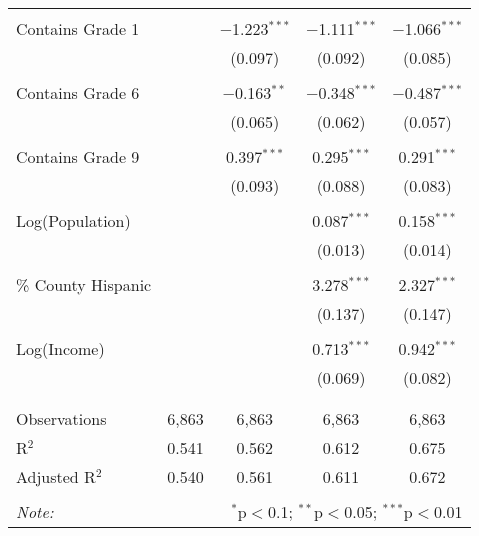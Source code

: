 \begin{table}[!htbp]
\begin{tabular}{@{\extracolsep{-2pt}}lcccc}
  & & & & \\ 
 Contains Grade 1 &  & $-$1.223$^{***}$ & $-$1.111$^{***}$ & $-$1.066$^{***}$ \\ 
  &  & (0.097) & (0.092) & (0.085) \\ 
  & & & & \\ 
 Contains Grade 6 &  & $-$0.163$^{**}$ & $-$0.348$^{***}$ & $-$0.487$^{***}$ \\ 
  &  & (0.065) & (0.062) & (0.057) \\ 
  & & & & \\ 
 Contains Grade 9 &  & 0.397$^{***}$ & 0.295$^{***}$ & 0.291$^{***}$ \\ 
  &  & (0.093) & (0.088) & (0.083) \\ 
  & & & & \\ 
 Log(Population) &  &  & 0.087$^{***}$ & 0.158$^{***}$ \\ 
  &  &  & (0.013) & (0.014) \\ 
  & & & & \\ 
 \% County Hispanic &  &  & 3.278$^{***}$ & 2.327$^{***}$ \\ 
  &  &  & (0.137) & (0.147) \\ 
  & & & & \\ 
 Log(Income) &  &  & 0.713$^{***}$ & 0.942$^{***}$ \\ 
  &  &  & (0.069) & (0.082) \\ 
  & & & & \\ 
\hline \\[-1.8ex] 
Observations & 6,863 & 6,863 & 6,863 & 6,863 \\ 
R$^{2}$ & 0.541 & 0.562 & 0.612 & 0.675 \\ 
Adjusted R$^{2}$ & 0.540 & 0.561 & 0.611 & 0.672 \\ 
\hline 
\hline \\[-1.8ex] 
\textit{Note:}  & \multicolumn{4}{r}{$^{*}$p$<$0.1; $^{**}$p$<$0.05; $^{***}$p$<$0.01} \\ 
\end{tabular} 
\end{table} 
